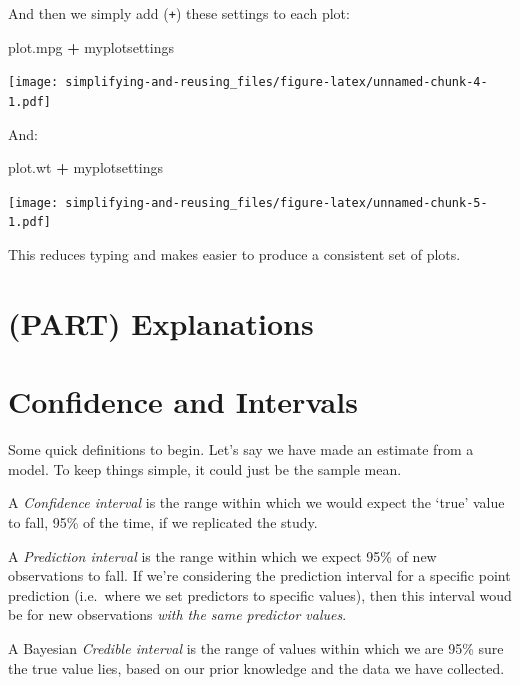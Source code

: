 \documentclass[]{article}
\newenvironment{Shaded}{\begin{snugshade}}{\end{snugshade}}
\newcommand{\StringTok}[1]{\textcolor[rgb]{0.31,0.60,0.02}{#1}}
\newcommand{\OperatorTok}[1]{\textcolor[rgb]{0.81,0.36,0.00}{\textbf{#1}}}
\newcommand{\NormalTok}[1]{#1}
\theoremstyle{definition}
\theoremstyle{definition}
\theoremstyle{definition}
\theoremstyle{remark}
\begin{document}
And then we simply add (\texttt{+}) these settings to each plot:

\begin{Shaded}
\begin{Highlighting}[]
\NormalTok{plot.mpg }\OperatorTok{+}\StringTok{ }\NormalTok{myplotsettings}
\end{Highlighting}
\end{Shaded}

\texttt{[image: simplifying-and-reusing\_files/figure-latex/unnamed-chunk-4-1.pdf]}

And:

\begin{Shaded}
\begin{Highlighting}[]
\NormalTok{plot.wt }\OperatorTok{+}\StringTok{ }\NormalTok{myplotsettings}
\end{Highlighting}
\end{Shaded}

\texttt{[image: simplifying-and-reusing\_files/figure-latex/unnamed-chunk-5-1.pdf]}

This reduces typing and makes easier to produce a consistent set of
plots.

\section{(PART) Explanations}\label{part-explanations}

\hypertarget{intervals}{\section{Confidence and
Intervals}\label{intervals}}

Some quick definitions to begin. Let's say we have made an estimate from
a model. To keep things simple, it could just be the sample mean.

A \emph{Confidence interval} is the range within which we would expect
the `true' value to fall, 95\% of the time, if we replicated the study.

A \emph{Prediction interval} is the range within which we expect 95\% of
new observations to fall. If we're considering the prediction interval
for a specific point prediction (i.e.~where we set predictors to
specific values), then this interval woud be for new observations
\emph{with the same predictor values}.

A Bayesian \emph{Credible interval} is the range of values within which
we are 95\% sure the true value lies, based on our prior knowledge and
the data we have collected.
\end{document}
